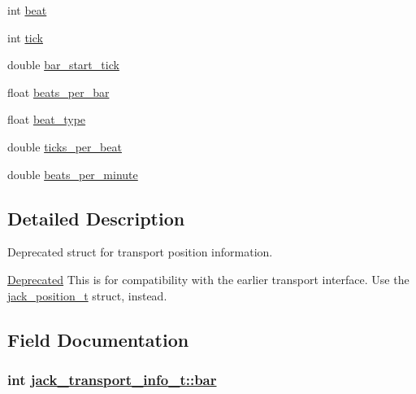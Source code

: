 \begin{CompactItemize}
\item 
int \hyperlink{structjack__transport__info__t_ed6966981beb595bd0a50e4371805dec}{beat}
\item 
int \hyperlink{structjack__transport__info__t_e5e5c0754f1e26bf915455e21cf2eba5}{tick}
\item 
double \hyperlink{structjack__transport__info__t_221202600540df269a7b86ff7061b7eb}{bar\_\-start\_\-tick}
\item 
float \hyperlink{structjack__transport__info__t_95db8c9493cb07af52d4d2fe851c52af}{beats\_\-per\_\-bar}
\item 
float \hyperlink{structjack__transport__info__t_aa2956fbbf561096f9e38ab6350bdb20}{beat\_\-type}
\item 
double \hyperlink{structjack__transport__info__t_fd4513bf48d81882ed9af87dd400a9db}{ticks\_\-per\_\-beat}
\item 
double \hyperlink{structjack__transport__info__t_348d88736ba362cf12317ec1f8af00ea}{beats\_\-per\_\-minute}
\end{CompactItemize}


\subsection{Detailed Description}
Deprecated struct for transport position information.

\begin{Desc}
\item[\hyperlink{deprecated__deprecated000004}{Deprecated}]This is for compatibility with the earlier transport interface. Use the \hyperlink{structjack__position__t}{jack\_\-position\_\-t} struct, instead. \end{Desc}




\subsection{Field Documentation}
\hypertarget{structjack__transport__info__t_37b51d194a7513e45b56f6524f2d51f2}{
\subsubsection[bar]{\setlength{\rightskip}{0pt plus 5cm}int \hyperlink{structjack__transport__info__t_37b51d194a7513e45b56f6524f2d51f2}{jack\_\-transport\_\-info\_\-t::bar}}}
\label{structjack__transport__info__t_37b51d194a7513e45b56f6524f2d51f2}


